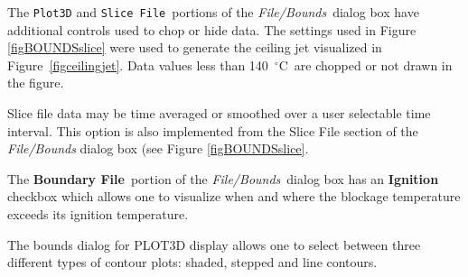 \documentclass[11pt,twoside]{book}
\newcommand{\degC}{$^\circ$C}
\begin{document}
The {\tt Plot3D} and {\tt Slice File}\ portions of the {\em File/Bounds}\
dialog box have additional controls used to chop or hide data.
The settings used in Figure \ref{figBOUNDSslice} were used to
generate the ceiling jet visualized in Figure~\ref{figceilingjet}.
Data values less than 140~\degC\ are chopped or not drawn in the
figure.

Slice file data may be time averaged or smoothed over a user
selectable time interval.  This option is also implemented from
the Slice File section of the {\em File/Bounds} dialog box (see Figure
\ref{figBOUNDSslice}.

The {\bf Boundary File}\ portion of the {\em File/Bounds}\ dialog box has an {\bf
Ignition} checkbox which allows one to visualize when and where
the blockage temperature exceeds its ignition temperature.

The bounds dialog for PLOT3D display allows one to select between
three different types of contour plots:  shaded, stepped and line
contours.
\end{document}
